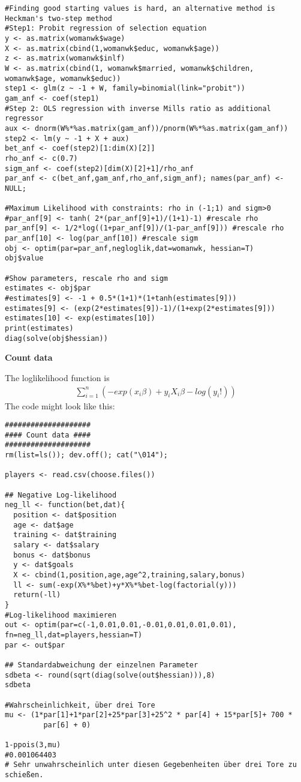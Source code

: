 \begin{Solution}{12.8}
\begin{enumerate}
\begin{verbatim}
#Finding good starting values is hard, an alternative method is Heckman's two-step method
#Step1: Probit regression of selection equation
y <- as.matrix(womanwk$wage)
X <- as.matrix(cbind(1,womanwk$educ, womanwk$age))
z <- as.matrix(womanwk$inlf)
W <- as.matrix(cbind(1, womanwk$married, womanwk$children, womanwk$age, womanwk$educ))
step1 <- glm(z ~ -1 + W, family=binomial(link="probit"))
gam_anf <- coef(step1)
#Step 2: OLS regression with inverse Mills ratio as additional regressor
aux <- dnorm(W%*%as.matrix(gam_anf))/pnorm(W%*%as.matrix(gam_anf))
step2 <- lm(y ~ -1 + X + aux)
bet_anf <- coef(step2)[1:dim(X)[2]]
rho_anf <- c(0.7)
sigm_anf <- coef(step2)[dim(X)[2]+1]/rho_anf
par_anf <- c(bet_anf,gam_anf,rho_anf,sigm_anf); names(par_anf) <- NULL;

#Maximum Likelihood with constraints: rho in (-1;1) and sigm>0
#par_anf[9] <- tanh( 2*(par_anf[9]+1)/(1+1)-1) #rescale rho
par_anf[9] <- 1/2*log((1+par_anf[9])/(1-par_anf[9])) #rescale rho
par_anf[10] <- log(par_anf[10]) #rescale sigm
obj <- optim(par=par_anf,negloglik,dat=womanwk, hessian=T)
obj$value

#Show parameters, rescale rho and sigm
estimates <- obj$par
#estimates[9] <- -1 + 0.5*(1+1)*(1+tanh(estimates[9]))
estimates[9] <- (exp(2*estimates[9])-1)/(1+exp(2*estimates[9]))
estimates[10] <- exp(estimates[10])
print(estimates)
diag(solve(obj$hessian))
\end{verbatim}

\end{enumerate}
\end{Solution}
\begin{Solution}{12.9}
\textbf{Count data}

The loglikelihood function is
\begin{align*}
\sum_{i=1}^{n}\left(-exp(x_i\beta) + y_i X_i\beta - log(y_i!)\right)
\end{align*}
The code might look like this:
\begin{verbatim}
####################
#### Count data ####
####################
rm(list=ls()); dev.off(); cat("\014");

players <- read.csv(choose.files())

## Negative Log-likelihood
neg_ll <- function(bet,dat){
  position <- dat$position
  age <- dat$age
  training <- dat$training
  salary <- dat$salary
  bonus <- dat$bonus
  y <- dat$goals
  X <- cbind(1,position,age,age^2,training,salary,bonus)
  ll <- sum(-exp(X%*%bet)+y*X%*%bet-log(factorial(y)))
  return(-ll)
}
#Log-likelihood maximieren
out <- optim(par=c(-1,0.01,0.01,-0.01,0.01,0.01,0.01), fn=neg_ll,dat=players,hessian=T)
par <- out$par

## Standardabweichung der einzelnen Parameter
sdbeta <- round(sqrt(diag(solve(out$hessian))),8)
sdbeta

#Wahrscheinlichkeit, über drei Tore
mu <- (1*par[1]+1*par[2]+25*par[3]+25^2 * par[4] + 15*par[5]+ 700 *
         par[6] + 0)

1-ppois(3,mu)
#0.001064403
# Sehr unwahrscheinlich unter diesen Gegebenheiten über drei Tore zu schießen.
\end{verbatim}
\end{Solution}
